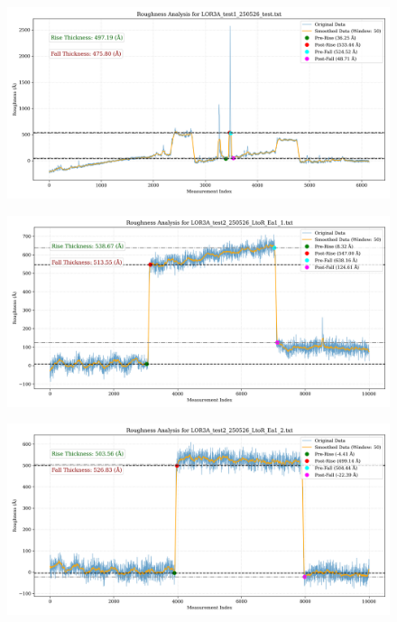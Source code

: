 \documentclass[platex,dvipdfmx,10pt,twoside,a4paper,jis2004]{jsarticle}
\begin{document}
\begin{figure}[H]
    \centering
    \includegraphics[width=\textwidth]{LOR3A_test1_250526_test.png}
    \label{fig:LOR3Atest1250526test}
\end{figure}
\begin{figure}[H]
    \centering
    \includegraphics[width=\textwidth]{LOR3A_test2_250526_LtoR_Ea1_1.png}
    \label{fig:LOR3Atest2250526LtoREa11}
\end{figure}
\begin{figure}[H]
    \centering
    \includegraphics[width=\textwidth]{LOR3A_test2_250526_LtoR_Ea1_2.png}
    \label{fig:LOR3Atest2250526LtoREa12}
\end{figure}
\end{document}
